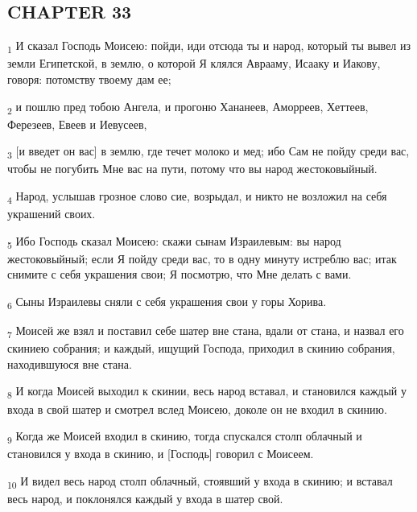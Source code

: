 \subsection{CHAPTER 33}
\begin{tcolorbox}
\textsubscript{1} И сказал Господь Моисею: пойди, иди отсюда ты и народ, который ты вывел из земли Египетской, в землю, о которой Я клялся Аврааму, Исааку и Иакову, говоря: потомству твоему дам ее;
\end{tcolorbox}
\begin{tcolorbox}
\textsubscript{2} и пошлю пред тобою Ангела, и прогоню Хананеев, Аморреев, Хеттеев, Ферезеев, Евеев и Иевусеев,
\end{tcolorbox}
\begin{tcolorbox}
\textsubscript{3} [и введет он вас] в землю, где течет молоко и мед; ибо Сам не пойду среди вас, чтобы не погубить Мне вас на пути, потому что вы народ жестоковыйный.
\end{tcolorbox}
\begin{tcolorbox}
\textsubscript{4} Народ, услышав грозное слово сие, возрыдал, и никто не возложил на себя украшений своих.
\end{tcolorbox}
\begin{tcolorbox}
\textsubscript{5} Ибо Господь сказал Моисею: скажи сынам Израилевым: вы народ жестоковыйный; если Я пойду среди вас, то в одну минуту истреблю вас; итак снимите с себя украшения свои; Я посмотрю, что Мне делать с вами.
\end{tcolorbox}
\begin{tcolorbox}
\textsubscript{6} Сыны Израилевы сняли с себя украшения свои у горы Хорива.
\end{tcolorbox}
\begin{tcolorbox}
\textsubscript{7} Моисей же взял и поставил себе шатер вне стана, вдали от стана, и назвал его скиниею собрания; и каждый, ищущий Господа, приходил в скинию собрания, находившуюся вне стана.
\end{tcolorbox}
\begin{tcolorbox}
\textsubscript{8} И когда Моисей выходил к скинии, весь народ вставал, и становился каждый у входа в свой шатер и смотрел вслед Моисею, доколе он не входил в скинию.
\end{tcolorbox}
\begin{tcolorbox}
\textsubscript{9} Когда же Моисей входил в скинию, тогда спускался столп облачный и становился у входа в скинию, и [Господь] говорил с Моисеем.
\end{tcolorbox}
\begin{tcolorbox}
\textsubscript{10} И видел весь народ столп облачный, стоявший у входа в скинию; и вставал весь народ, и поклонялся каждый у входа в шатер свой.
\end{tcolorbox}

